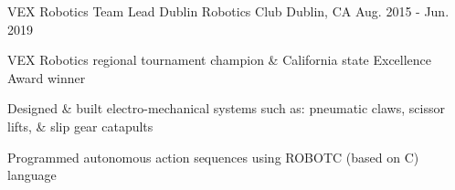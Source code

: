 \begin{cventries}

 \cventry
 {VEX Robotics Team Lead} %
 {Dublin Robotics Club} %
 {Dublin, CA} %
 {Aug. 2015 - Jun. 2019} %
 { %
 \begin{cvitems}
 \item {VEX Robotics regional tournament champion \& California state Excellence Award winner}
 \item {Designed \& built electro-mechanical systems such as: pneumatic claws, scissor lifts, \& slip gear catapults}
 \item {Programmed autonomous action sequences using ROBOTC (based on C) language}
\end{cvitems}
}













\end{cventries}